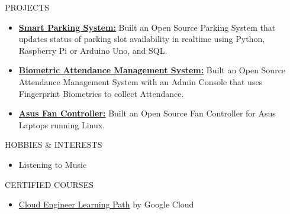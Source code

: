 \documentclass{resume}
\begin{document}
\vspace{0.8em}
\begin{rSection}{PROJECTS}
\begin{itemize}
    \item \textbf{\href{https://github.com/Arkapravo-Ghosh/Smart-Parking-System}{Smart Parking System:}} {Built an Open Source Parking System that updates status of parking slot availability in realtime using Python, Raspberry Pi or Arduino Uno, and SQL.}

    \item \textbf{\href{https://github.com/Arkapravo-Ghosh/attendance-monitoring-system}{Biometric Attendance Management System:}} {Built an Open Source Attendance Management System with an Admin Console that uses Fingerprint Biometrics to collect Attendance.}

    \item \textbf{\href{https://github.com/Arkapravo-Ghosh/asus-fan-mode}{Asus Fan Controller:}} {Built an Open Source Fan Controller for Asus Laptops running Linux.}
\end{itemize}
\end{rSection}
\vspace{0.8em}
\begin{rSection}{HOBBIES \& INTERESTS}
\begin{itemize}
    \item Listening to Music
\end{itemize}
\end{rSection}
\vspace{0.8em}
\begin{rSection}{CERTIFIED COURSES}
\begin{itemize}
    \item \href{https://www.cloudskillsboost.google/public_profiles/7594501c-7933-4fba-be9b-2a92ca3ee410}{Cloud Engineer Learning Path} by Google Cloud
\end{itemize}
\end{rSection}
\end{document}

